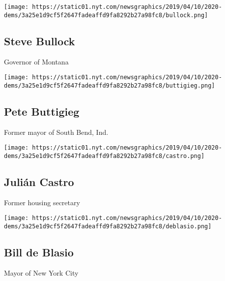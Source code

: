 \href{https://www.nytimes.com/interactive/2019/us/politics/steve-bullock-2020-campaign.html}{}

\texttt{[image: https://static01.nyt.com/newsgraphics/2019/04/10/2020-dems/3a25e1d9cf5f2647fadeaffd9fa8292b27a98fc8/bullock.png]}

\hypertarget{steve-bullock}{%
\subsection{Steve Bullock}\label{steve-bullock}}

Governor of Montana

\href{https://www.nytimes.com/interactive/2019/us/politics/pete-buttigieg-2020-campaign.html}{}

\texttt{[image: https://static01.nyt.com/newsgraphics/2019/04/10/2020-dems/3a25e1d9cf5f2647fadeaffd9fa8292b27a98fc8/buttigieg.png]}

\hypertarget{pete-buttigieg}{%
\subsection{Pete Buttigieg}\label{pete-buttigieg}}

Former mayor of South Bend, Ind.

\href{https://www.nytimes.com/interactive/2019/us/politics/julian-castro-2020-campaign.html}{}

\texttt{[image: https://static01.nyt.com/newsgraphics/2019/04/10/2020-dems/3a25e1d9cf5f2647fadeaffd9fa8292b27a98fc8/castro.png]}

\hypertarget{juliuxe1n-castro}{%
\subsection{Julián Castro}\label{juliuxe1n-castro}}

Former housing secretary

\href{https://www.nytimes.com/interactive/2019/us/politics/bill-de-blasio-2020-campaign.html}{}

\texttt{[image: https://static01.nyt.com/newsgraphics/2019/04/10/2020-dems/3a25e1d9cf5f2647fadeaffd9fa8292b27a98fc8/deblasio.png]}

\hypertarget{bill-de-blasio}{%
\subsection{Bill de Blasio}\label{bill-de-blasio}}

Mayor of New York City

